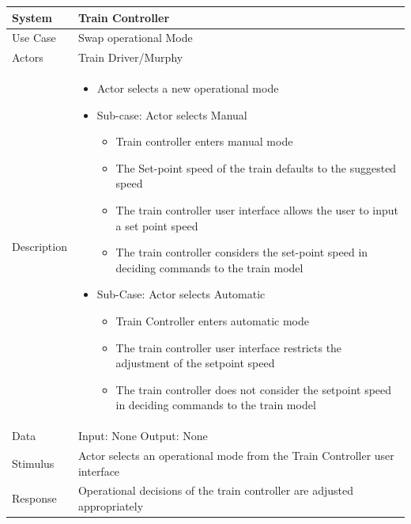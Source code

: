 \documentclass{article}
\begin{document}
     \begin{longtable}{
    || >{\raggedright\arraybackslash}m{}
    | >{\raggedright\arraybackslash}m{}||}
    \hline
    \textbf{System} & \textbf{Train Controller} \\
    \hline
    Use Case & Swap operational Mode\\
    \hline
    Actors & Train Driver/Murphy\\
    \hline
    Description & \begin{itemize}
        \item Actor selects a new operational mode
        \item Sub-case: Actor selects Manual
        \begin{itemize}
            \item Train controller enters manual mode
            \item The Set-point speed of the train defaults to the suggested speed
            \item The train controller user interface allows the user to input a set point speed
            \item The train controller considers the set-point speed in deciding commands to the train model
        \end{itemize}
        \item Sub-Case: Actor selects Automatic
        \begin{itemize}
            \item Train Controller enters automatic mode
            \item The train controller user interface restricts the adjustment of the setpoint speed
            \item The train controller does not consider the setpoint speed in deciding commands to the train model
        \end{itemize}
    \end{itemize}\\
    \hline
    Data & Input: None \newline Output: None\\
    \hline
    Stimulus & Actor selects an operational mode from the Train Controller user interface\\
    \hline
    Response & Operational decisions of the train controller are adjusted appropriately\\
    \hline
    \end{longtable}
    
\end{document}
